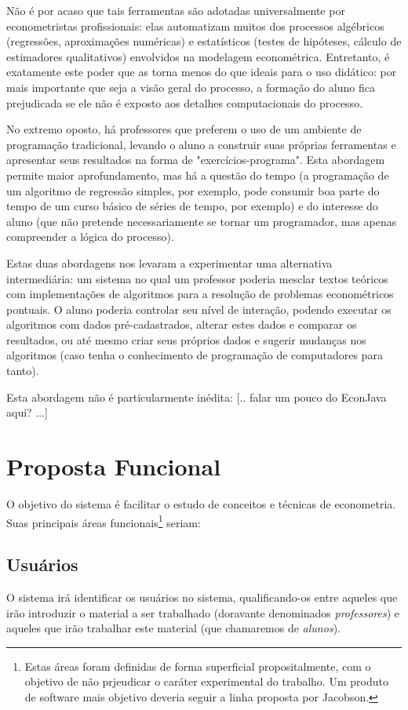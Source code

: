 \documentclass{abnt}
\begin{document}
Não é por acaso que tais ferramentas são adotadas universalmente por econometristas profissionais: elas automatizam muitos dos processos algébricos (regressões, aproximações numéricas) e estatísticos (testes de hipóteses, cálculo de estimadores qualitativos) envolvidos na modelagem econométrica. Entretanto, é exatamente este poder que as torna menos do que ideais para o uso didático: por mais importante que seja a visão geral do processo, a formação do aluno fica prejudicada se ele não é exposto aos detalhes computacionais do processo.

No extremo oposto, há professores que preferem o uso de um ambiente de programação tradicional, levando o aluno a construir suas próprias ferramentas e apresentar seus resultados na forma de "exercícios-programa". Esta abordagem permite maior aprofundamento, mas há a questão do tempo (a programação de um algoritmo de regressão simples, por exemplo, pode consumir boa parte do tempo de um curso básico de séries de tempo, por exemplo) e do interesse do aluno (que não pretende necessariamente se tornar um programador, mas apenas compreender a lógica do processo).

Estas duas abordagens nos levaram a experimentar uma alternativa intermediária: um sistema no qual um professor poderia mesclar textos teóricos com implementações de algoritmos para a resolução de problemas econométricos pontuais. O aluno poderia controlar seu nível de interação, podendo executar os algoritmos com dados pré-cadastrados, alterar estes dados e comparar os resultados, ou até mesmo criar seus próprios dados e sugerir mudanças nos algoritmos (caso tenha o conhecimento de programação de computadores para tanto).

Esta abordagem não é particularmente inédita: [.. falar um pouco do EconJava aqui? ...]

\section{Proposta Funcional}

O objetivo do sistema é facilitar o estudo de conceitos e técnicas de econometria. Suas principais áreas funcionais\footnote{Estas áreas foram definidas de forma superficial propositalmente, com o objetivo de não prjeudicar o caráter experimental do trabalho. Um produto de software mais objetivo deveria seguir a linha proposta por Jacobson\cite{Jacobson}.} seriam:

\subsection{Usuários}
O sistema irá identificar os usuários no sistema, qualificando-os entre aqueles que irão introduzir o material a ser trabalhado (doravante denominados \textit{professores}) e aqueles que irão trabalhar este material (que chamaremos de \textit{alunos}).
\end{document}
